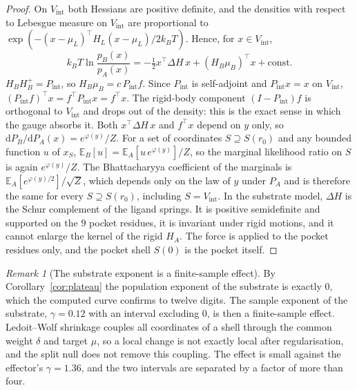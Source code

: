 \documentclass[11pt,reqno]{amsart}
\theoremstyle{plain}
\theoremstyle{definition}
\theoremstyle{remark}
\newtheorem{remark}[theorem]{Remark}
\numberwithin{equation}{section}
\newcommand{\dd}{\mathrm{d}}
\newcommand{\EE}{\mathbb{E}}
\begin{document}
\begin{proof}
On $V_{\mathrm{int}}$ both Hessians are positive definite, and the densities with respect to Lebesgue measure on $V_{\mathrm{int}}$ are proportional to $\exp(-(x-\mu_L)^{\top}H_L(x-\mu_L)/2k_BT)$. Hence, for $x\in V_{\mathrm{int}}$,
\[
k_BT\ln\frac{p_B(x)}{p_A(x)}=-\tfrac12x^{\top}\Delta H\,x+(H_B\mu_B)^{\top}x+\mathrm{const}.
\]
$H_BH_B^{+}=P_{\mathrm{int}}$, so $H_B\mu_B=c\,P_{\mathrm{int}}f$. Since $P_{\mathrm{int}}$ is self-adjoint and $P_{\mathrm{int}}x=x$ on $V_{\mathrm{int}}$, $(P_{\mathrm{int}}f)^{\top}x=f^{\top}P_{\mathrm{int}}x=f^{\top}x$. The rigid-body component $(I-P_{\mathrm{int}})f$ is orthogonal to $V_{\mathrm{int}}$ and drops out of the density: this is the exact sense in which the gauge absorbs it. Both $x^{\top}\Delta H\,x$ and $f^{\top}x$ depend on $y$ only, so $\dd P_B/\dd P_A(x)=e^{\varphi(y)}/Z$. For a set of coordinates $S\supseteq S(r_0)$ and any bounded function $u$ of $x_S$, $\EE_B[u]=\EE_A[u\,e^{\varphi(y)}]/Z$, so the marginal likelihood ratio on $S$ is again $e^{\varphi(y)}/Z$. The Bhattacharyya coefficient of the marginals is $\EE_A[e^{\varphi(y)/2}]/\sqrt Z$, which depends only on the law of $y$ under $P_A$ and is therefore the same for every $S\supseteq S(r_0)$, including $S=V_{\mathrm{int}}$. In the substrate model, $\Delta H$ is the Schur complement of the ligand springs. It is positive semidefinite and supported on the $9$ pocket residues, it is invariant under rigid motions, and it cannot enlarge the kernel of the rigid $H_A$. The force is applied to the pocket residues only, and the pocket shell $S(0)$ is the pocket itself.
\end{proof}

\begin{remark}[The substrate exponent is a finite-sample effect]
By Corollary~\ref{cor:plateau} the population exponent of the substrate is exactly $0$, which the computed curve confirms to twelve digits. The sample exponent of the substrate, $\gamma=0.12$ with an interval excluding $0$, is then a finite-sample effect. Ledoit--Wolf shrinkage couples all coordinates of a shell through the common weight $\delta$ and target $\mu$, so a local change is not exactly local after regularisation, and the split null does not remove this coupling. The effect is small against the effector's $\gamma=1.36$, and the two intervals are separated by a factor of more than four.
\end{remark}
\end{document}
